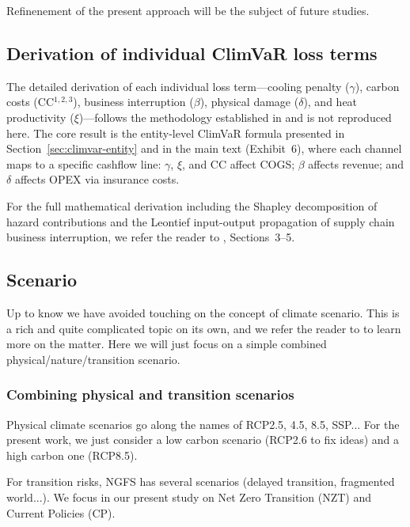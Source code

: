 Refinenement of the present approach will be the subject of future studies.


\subsection{Derivation of individual ClimVaR loss terms} \label{sec:climvar-terms}

The detailed derivation of each individual loss term---cooling penalty ($\gamma$), carbon costs (CC$^{1,2,3}$), business interruption ($\beta$), physical damage ($\delta$), and heat productivity ($\xi$)---follows the methodology established in \citet{epelbaum2025} and is not reproduced here. The core result is the entity-level ClimVaR formula presented in Section~\ref{sec:climvar-entity} and in the main text (Exhibit~6), where each channel maps to a specific cashflow line: $\gamma$, $\xi$, and CC affect COGS; $\beta$ affects revenue; and $\delta$ affects OPEX via insurance costs.

For the full mathematical derivation including the Shapley decomposition of hazard contributions and the Leontief input-output propagation of supply chain business interruption, we refer the reader to \citet{epelbaum2025}, Sections~3--5.

\subsection{Scenario} \label{sec:scenario}

Up to know we have avoided touching on the concept of climate scenario. This is a rich and quite complicated topic \cite{IPCCScenario} on its own, and we refer the reader to \cite{IPCCScenario}\cite{NGFS1} to learn more on the matter. Here we will just focus on a simple combined physical/nature/transition scenario. 

\subsubsection{Combining physical and transition scenarios} \label{sec:scenario-inter}

Physical climate scenarios go along the names of RCP2.5, 4.5, 8.5, SSP... For the present work, we just consider a low carbon scenario (RCP2.6 to fix ideas) and a high carbon one (RCP8.5).

\vspace{0.2cm}

For transition risks, NGFS \cite{NGFS1}\cite{NGFS2}\cite{NGFS3} has several scenarios (delayed transition, fragmented world...). We focus in our present study on Net Zero Transition (NZT) and Current Policies (CP).

